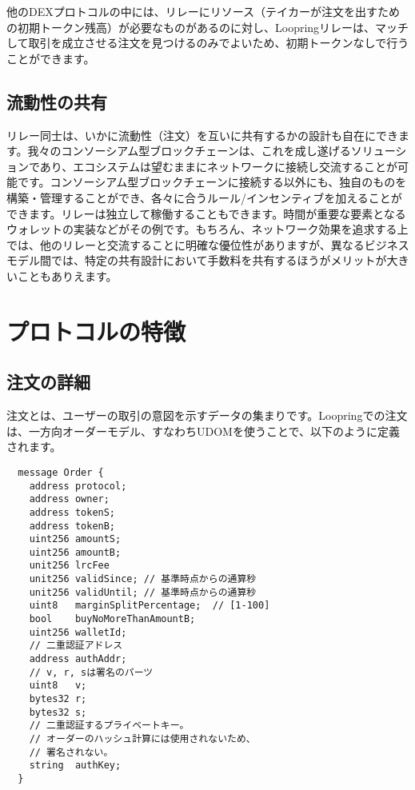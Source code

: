 \documentclass{article}
\begin{document}
\begin{multicols}{2}
他のDEXプロトコルの中には、リレーにリソース（テイカーが注文を出すための初期トークン残高）が必要なものがあるのに対し、Loopringリレーは、マッチして取引を成立させる注文を見つけるのみでよいため、初期トークンなしで行うことができます。

\subsection{流動性の共有\label{sec:liquidity_sharing}}
リレー同士は、いかに流動性（注文）を互いに共有するかの設計も自在にできます。我々のコンソーシアム型ブロックチェーンは、これを成し遂げるソリューションであり、エコシステムは望むままにネットワークに接続し交流することが可能です。コンソーシアム型ブロックチェーンに接続する以外にも、独自のものを構築・管理することができ、各々に合うルール/インセンティブを加えることができます。リレーは独立して稼働することもできます。時間が重要な要素となるウォレットの実装などがその例です。もちろん、ネットワーク効果を追求する上では、他のリレーと交流することに明確な優位性がありますが、異なるビジネスモデル間では、特定の共有設計において手数料を共有するほうがメリットが大きいこともありえます。


\section{プロトコルの特徴\label{sec:protocol}}

\subsection{注文の詳細\label{anatomy}}
注文とは、ユーザーの取引の意図を示すデータの集まりです。Loopringでの注文は、一方向オーダーモデル、すなわちUDOMを使うことで、以下のように定義されます。

\begin{verbatim}
  message Order {
    address protocol;
    address owner;
    address tokenS;
    address tokenB;
    uint256 amountS;
    uint256 amountB;
    unit256 lrcFee
    unit256 validSince; // 基準時点からの通算秒
    unit256 validUntil; // 基準時点からの通算秒
    uint8   marginSplitPercentage;  // [1-100]
    bool    buyNoMoreThanAmountB;
    uint256 walletId;
    // 二重認証アドレス
    address authAddr;
   	// v, r, sは署名のパーツ
    uint8   v;       
    bytes32 r;
    bytes32 s;
    // 二重認証するプライベートキー。
    // オーダーのハッシュ計算には使用されないため、
    // 署名されない。
    string  authKey;          
  }
\end{verbatim}



\end{multicols}
\end{document}
